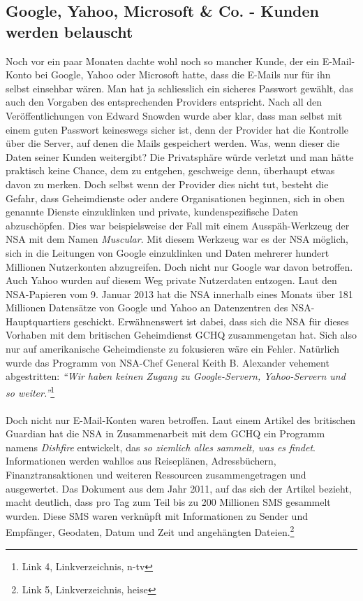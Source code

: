 \subsection{Google, Yahoo, Microsoft \& Co. - Kunden werden belauscht}
Noch vor ein paar Monaten dachte wohl noch so mancher Kunde, der ein E-Mail-Konto bei Google, Yahoo oder Microsoft hatte, dass die E-Mails nur für ihn selbst einsehbar wären. Man hat ja schliesslich ein sicheres Passwort gewählt, das auch den Vorgaben des entsprechenden Providers entspricht. Nach all den Veröffentlichungen von Edward Snowden wurde aber klar, dass man selbst mit einem guten Passwort keineswegs sicher ist, denn der Provider hat die Kontrolle über die Server, auf denen die Mails gespeichert werden. Was, wenn dieser die Daten seiner Kunden weitergibt? Die Privatsphäre würde verletzt und man hätte praktisch keine Chance, dem zu entgehen, geschweige denn, überhaupt etwas davon zu merken. Doch selbst wenn der Provider dies nicht tut, besteht die Gefahr, dass Geheimdienste oder andere Organisationen beginnen, sich in oben genannte Dienste einzuklinken und private, kundenspezifische Daten abzuschöpfen. Dies war beispielsweise der Fall mit einem Ausspäh-Werkzeug der NSA mit dem Namen \textit{Muscular}. Mit diesem Werkzeug war es der NSA möglich, sich in die Leitungen von Google einzuklinken und Daten mehrerer hundert Millionen Nutzerkonten abzugreifen. Doch nicht nur Google war davon betroffen. Auch Yahoo wurden auf diesem Weg private Nutzerdaten entzogen. Laut den NSA-Papieren vom 9. Januar 2013 hat die NSA innerhalb eines Monats über 181 Millionen Datensätze von Google und Yahoo an Datenzentren des NSA-Hauptquartiers geschickt. Erwähnenswert ist dabei, dass sich die NSA für dieses Vorhaben mit dem britischen Geheimdienst GCHQ zusammengetan hat. Sich also nur auf amerikanische Geheimdienste zu fokusieren wäre ein Fehler. Natürlich wurde das Programm von NSA-Chef General Keith B. Alexander vehement abgestritten: \textit{``Wir haben keinen Zugang zu Google-Servern, Yahoo-Servern und so weiter.''}\footnote{Link 4, Linkverzeichnis, n-tv}
\\
\\
Doch nicht nur E-Mail-Konten waren betroffen. Laut einem Artikel des britischen Guardian hat die NSA in Zusammenarbeit mit dem GCHQ ein Programm namens \textit{Dishfire} entwickelt, das \textit{so ziemlich alles sammelt, was es findet}. Informationen werden wahllos aus Reiseplänen, Adressbüchern, Finanztransaktionen und weiteren Ressourcen zusammengetragen und ausgewertet. Das Dokument aus dem Jahr 2011, auf das sich der Artikel bezieht, macht deutlich, dass pro Tag zum Teil bis zu 200 Millionen SMS gesammelt wurden. Diese SMS waren verknüpft mit Informationen zu Sender und Empfänger, Geodaten, Datum und Zeit und angehängten Dateien.\footnote{Link 5, Linkverzeichnis, heise}

